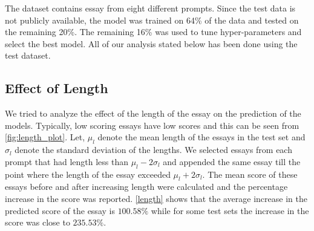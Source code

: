\documentclass[11pt,a4paper]{article}
\begin{document}
The dataset contains essay from eight different prompts. Since the test data is not publicly available, the model was trained on 64\% of the data and tested on the remaining 20\%. The remaining 16\% was used to tune hyper-parameters and select the best model.
All of our analysis stated below has been done using the test dataset.

\subsection{Effect of Length}

We tried to analyze the effect of the length of the essay on the prediction of the models. Typically, low scoring essays have low scores and this can be seen from \cref{fig:length_plot}. Let, $\mu_l$ denote the mean length of the essays in the test set and $\sigma_l$ denote the standard deviation of the lengths. We selected essays from each prompt that had length less than $\mu_l - 2\sigma_l$ and appended the same essay till the point where the length of the essay exceeded $\mu_l + 2\sigma_l$. The mean score of these essays before and after increasing length were calculated and the percentage increase in the score was reported. \cref{length} shows that the average increase in the predicted score of the essay is $100.58\%$ while for some test sets the increase in the score was close to $235.53\%$. 
\end{document}
